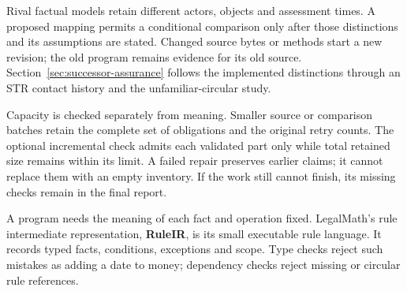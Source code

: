 \documentclass[12pt,a4paper,oneside,openany]{book}
\begin{document}
\begin{MapDiagram}
\end{MapDiagram}

Rival factual models retain different actors, objects and assessment times.
A proposed mapping permits a conditional comparison only after those
distinctions and its assumptions are stated. Changed source bytes or methods
start a new revision; the old program remains evidence for its old source.
Section~\ref{sec:successor-assurance} follows the implemented distinctions
through an STR contact history and the unfamiliar-circular study.

Capacity is checked separately from meaning. Smaller source or comparison
batches retain the complete set of obligations and the original retry counts.
The optional incremental check admits each validated part only while total
retained size remains within its limit. A failed repair preserves earlier
claims; it cannot replace them with an empty inventory. If the work still
cannot finish, its missing checks remain in the final report.

\clearpage
{}
A program needs the meaning of each fact and operation fixed. LegalMath's rule
intermediate representation, \textbf{RuleIR}, is its small executable rule
language. It records typed facts, conditions, exceptions and scope. Type checks
reject such mistakes as adding a date to money; dependency checks reject
missing or circular rule references.
\end{document}
